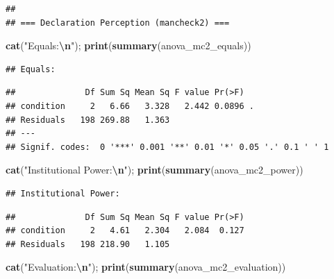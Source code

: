 \documentclass[
]{article}
\newenvironment{Shaded}{\begin{snugshade}}{\end{snugshade}}
\newcommand{\FunctionTok}[1]{\textcolor[rgb]{0.13,0.29,0.53}{\textbf{#1}}}
\newcommand{\NormalTok}[1]{#1}
\newcommand{\SpecialCharTok}[1]{\textcolor[rgb]{0.81,0.36,0.00}{\textbf{#1}}}
\newcommand{\StringTok}[1]{\textcolor[rgb]{0.31,0.60,0.02}{#1}}
\begin{document}
\begin{verbatim}
## 
## === Declaration Perception (mancheck2) ===
\end{verbatim}

\begin{Shaded}
\begin{Highlighting}[]
\FunctionTok{cat}\NormalTok{(}\StringTok{"Equals:}\SpecialCharTok{\textbackslash{}n}\StringTok{"}\NormalTok{);               }\FunctionTok{print}\NormalTok{(}\FunctionTok{summary}\NormalTok{(anova\_mc2\_equals))}
\end{Highlighting}
\end{Shaded}

\begin{verbatim}
## Equals:
\end{verbatim}

\begin{verbatim}
##              Df Sum Sq Mean Sq F value Pr(>F)  
## condition     2   6.66   3.328   2.442 0.0896 .
## Residuals   198 269.88   1.363                 
## ---
## Signif. codes:  0 '***' 0.001 '**' 0.01 '*' 0.05 '.' 0.1 ' ' 1
\end{verbatim}

\begin{Shaded}
\begin{Highlighting}[]
\FunctionTok{cat}\NormalTok{(}\StringTok{"Institutional Power:}\SpecialCharTok{\textbackslash{}n}\StringTok{"}\NormalTok{);  }\FunctionTok{print}\NormalTok{(}\FunctionTok{summary}\NormalTok{(anova\_mc2\_power))}
\end{Highlighting}
\end{Shaded}

\begin{verbatim}
## Institutional Power:
\end{verbatim}

\begin{verbatim}
##              Df Sum Sq Mean Sq F value Pr(>F)
## condition     2   4.61   2.304   2.084  0.127
## Residuals   198 218.90   1.105
\end{verbatim}

\begin{Shaded}
\begin{Highlighting}[]
\FunctionTok{cat}\NormalTok{(}\StringTok{"Evaluation:}\SpecialCharTok{\textbackslash{}n}\StringTok{"}\NormalTok{);           }\FunctionTok{print}\NormalTok{(}\FunctionTok{summary}\NormalTok{(anova\_mc2\_evaluation))}
\end{Highlighting}
\end{Shaded}
\end{document}

